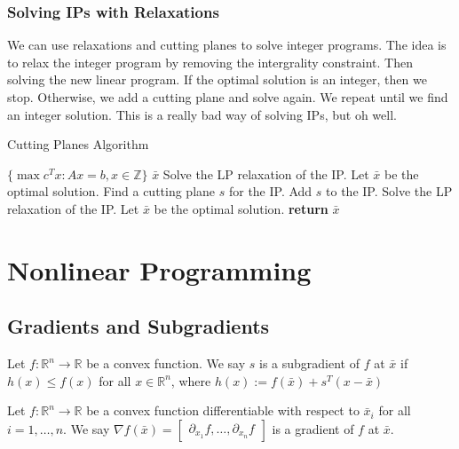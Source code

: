 \documentclass[a4paper]{report}
\begin{document}
\subsection{Solving IPs with Relaxations}
We can use relaxations and cutting planes to solve integer programs. The idea is to relax the integer program by removing the intergrality constraint. Then solving the new linear program. If the optimal solution is an integer, then we stop. Otherwise, we add a cutting plane and solve again. We repeat until we find an integer solution. This is a really bad way of solving IPs, but oh well.

\begin{algorithm}
  \algrenewcommand{}
  \algrenewcommand{}
  \caption{Cutting Planes Algorithm}
  \label{alg:cut}
  \begin{algorithmic}[1]
    \Require $\{\max c^Tx : Ax = b, x \in \mathbb Z\}$
    \Ensure $\bar x$
    \State Solve the LP relaxation of the IP. Let $\bar x$ be the optimal solution.
      \State Find a cutting plane $s$ for the IP.
      \State Add $s$ to the IP.
      \State Solve the LP relaxation of the IP. Let $\bar x$ be the optimal solution.
    \EndWhile
    \State \textbf{return} $\bar x$
  \end{algorithmic}
\end{algorithm}


\chapter{Nonlinear Programming}
\section{Gradients and Subgradients}
\begin{definition}[Subgradient]\label{subgradient}
  Let $f : \mathbb R^n \rightarrow \mathbb R$ be a convex function. We say $s$ is a subgradient of $f$ at $\bar x$ if $h(x) \leq f(x)$ for all $x \in \mathbb R^n$, where $h(x) := f(\bar x) + s^T (x - \bar x)$
\end{definition}
\begin{definition}[Gradient]
  Let $f : \mathbb R^n \rightarrow \mathbb R$ be a convex function differentiable with respect to $\bar x_i$ for all $i = 1, \dots, n$. We say $\nabla f(\bar x) = \begin{bmatrix}\partial_{x_1}f, \dots, \partial_{x_n} f\end{bmatrix}$ is a gradient of $f$ at $\bar x$.
\end{definition}
\end{document}
